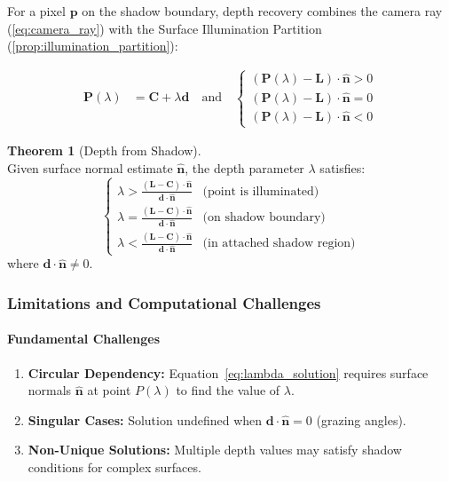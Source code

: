 \documentclass[12pt]{article}
\newcommand{\vect}[1]{\bm{#1}}
\theoremstyle{definition}
\newtheorem{theorem}{Theorem}[subsection]
\begin{document}
For a pixel $\vect{p}$ on the shadow boundary, depth recovery combines the camera ray (\ref{eq:camera_ray}) with the Surface Illumination Partition (\ref{prop:illumination_partition}):

\begin{equation}
\boxed{
\begin{aligned}
\vect{P}(\lambda) &= \vect{C} + \lambda \vect{d} \quad \text{and} \quad
\begin{cases}
(\vect{P}(\lambda) - \vect{L}) \cdot \hat{\vect{n}} > 0 \\[6pt]
(\vect{P}(\lambda) - \vect{L}) \cdot \hat{\vect{n}} = 0 \\[6pt]
(\vect{P}(\lambda) - \vect{L}) \cdot \hat{\vect{n}} < 0
\end{cases}
\end{aligned}
}
\label{eq:shadow_depth_system}
\end{equation}

\begin{theorem}[Depth from Shadow] \label{thm:shadow_depth} ~\\
Given surface normal estimate \(\hat{\vect{n}}\), the depth parameter \(\lambda\) satisfies:
\begin{equation}
\boxed{
\begin{cases}
\lambda > \displaystyle \frac{(\vect{L} - \vect{C}) \cdot \hat{\vect{n}}}{\vect{d} \cdot \hat{\vect{n}}} & \text{(point is illuminated)} \\[8pt]
\lambda = \displaystyle \frac{(\vect{L} - \vect{C}) \cdot \hat{\vect{n}}}{\vect{d} \cdot \hat{\vect{n}}} & \text{(on shadow boundary)} \\[8pt]
\lambda < \displaystyle \frac{(\vect{L} - \vect{C}) \cdot \hat{\vect{n}}}{\vect{d} \cdot \hat{\vect{n}}} & \text{(in attached shadow region)}
\end{cases}
}
\label{eq:lambda_solution}
\end{equation}
where \(\vect{d} \cdot \hat{\vect{n}} \neq 0\).
\end{theorem}

\subsubsection*{Limitations and Computational Challenges} \label{sec:shadow_limitations}

\paragraph{Fundamental Challenges}
\begin{enumerate}[label=\arabic*.]
    \item \textbf{Circular Dependency:} Equation~\eqref{eq:lambda_solution} requires surface normals $\hat{\vect{n}}$ at point $P(\lambda)$ to find the value of $\lambda$.
    
    \item \textbf{Singular Cases:} Solution undefined when $\vect{d} \cdot \hat{\vect{n}} = 0$ (grazing angles).
    
    \item \textbf{Non-Unique Solutions:} Multiple depth values may satisfy shadow conditions for complex surfaces.
\end{enumerate}
\end{document}

